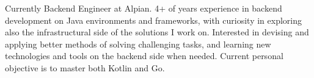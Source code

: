 

\begin{cvparagraph}
	
	Currently Backend Engineer at Alpian. 4+ of years experience in backend development on Java environments and frameworks, with curiosity in exploring also the infrastructural side of the solutions I work on. Interested in devising and applying better methods of solving challenging tasks, and learning new technologies and tools on the backend side when needed. Current personal objective is to master both Kotlin and Go.
\end{cvparagraph}